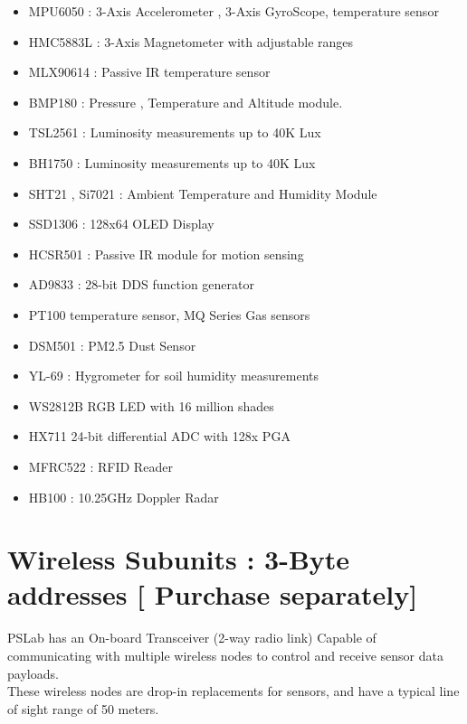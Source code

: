 \documentclass[11pt,article,sans]{moderncv} %
\begin{document}
\begin{adjustwidth}{7em}{0pt}

\begin{itemize}
\item MPU6050 : 3-Axis Accelerometer , 3-Axis GyroScope, temperature sensor
\item HMC5883L : 3-Axis Magnetometer with adjustable ranges
\item MLX90614 : Passive IR temperature sensor
\item BMP180 : Pressure , Temperature and Altitude module.
\item TSL2561 : Luminosity measurements up to 40K Lux
\item BH1750 : Luminosity measurements up to 40K Lux
\item SHT21 , Si7021 : Ambient Temperature and Humidity Module
\item SSD1306 : 128x64 OLED Display
\item HCSR501 : Passive IR module for motion sensing
\item AD9833 : 28-bit DDS function generator
\item PT100 temperature sensor, MQ Series Gas sensors
\item DSM501 : PM2.5 Dust Sensor
\item YL-69 : Hygrometer for soil humidity measurements
\item WS2812B RGB LED with 16 million shades 
\item HX711 24-bit differential ADC with 128x PGA
\item MFRC522 : RFID Reader
\item HB100 : 10.25GHz Doppler Radar
\end{itemize}
\end{adjustwidth}


\section{Wireless Subunits : 3-Byte addresses [ Purchase separately]}

PSLab has an On-board Transceiver (2-way radio link) Capable of communicating with multiple wireless nodes to control and receive sensor data payloads.\\ These wireless nodes are drop-in replacements for sensors, and have a typical line of sight range of 50 meters.

\begin{center}


\end{center}
\end{document}
